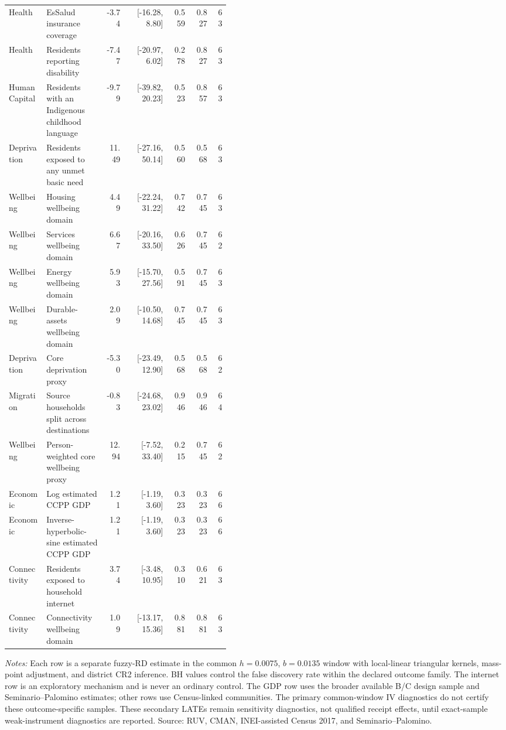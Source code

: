 \begin{longtable}{p{0.17\linewidth}p{0.27\linewidth}rrrrr}
Health & EsSalud insurance coverage & -3.74 & [-16.28, 8.80] & 0.559 & 0.827 & 63 \\
Health & Residents reporting disability & -7.47 & [-20.97, 6.02] & 0.278 & 0.827 & 63 \\
Human Capital & Residents with an Indigenous childhood language & -9.79 & [-39.82, 20.23] & 0.523 & 0.857 & 63 \\
Deprivation & Residents exposed to any unmet basic need & 11.49 & [-27.16, 50.14] & 0.560 & 0.568 & 63 \\
Wellbeing & Housing wellbeing domain & 4.49 & [-22.24, 31.22] & 0.742 & 0.745 & 63 \\
Wellbeing & Services wellbeing domain & 6.67 & [-20.16, 33.50] & 0.626 & 0.745 & 62 \\
Wellbeing & Energy wellbeing domain & 5.93 & [-15.70, 27.56] & 0.591 & 0.745 & 63 \\
Wellbeing & Durable-assets wellbeing domain & 2.09 & [-10.50, 14.68] & 0.745 & 0.745 & 63 \\
Deprivation & Core deprivation proxy & -5.30 & [-23.49, 12.90] & 0.568 & 0.568 & 62 \\
Migration & Source households split across destinations & -0.83 & [-24.68, 23.02] & 0.946 & 0.946 & 64 \\
Wellbeing & Person-weighted core wellbeing proxy & 12.94 & [-7.52, 33.40] & 0.215 & 0.745 & 62 \\
Economic & Log estimated CCPP GDP & 1.21 & [-1.19, 3.60] & 0.323 & 0.323 & 66 \\
Economic & Inverse-hyperbolic-sine estimated CCPP GDP & 1.21 & [-1.19, 3.60] & 0.323 & 0.323 & 66 \\
Connectivity & Residents exposed to household internet & 3.74 & [-3.48, 10.95] & 0.310 & 0.621 & 63 \\
Connectivity & Connectivity wellbeing domain & 1.09 & [-13.17, 15.36] & 0.881 & 0.881 & 63 \\
\bottomrule
\end{longtable}
\begin{minipage}{0.98\linewidth}\footnotesize\textit{Notes:} Each row is a separate fuzzy-RD estimate in the common \(h=0.0075\), \(b=0.0135\) window with local-linear triangular kernels, mass-point adjustment, and district CR2 inference. BH values control the false discovery rate within the declared outcome family. The internet row is an exploratory mechanism and is never an ordinary control. The GDP row uses the broader available B/C design sample and Seminario--Palomino estimates; other rows use Census-linked communities. The primary common-window IV diagnostics do not certify these outcome-specific samples. These secondary LATEs remain sensitivity diagnostics, not qualified receipt effects, until exact-sample weak-instrument diagnostics are reported. Source: RUV, CMAN, INEI-assisted Census 2017, and Seminario--Palomino.\end{minipage}
